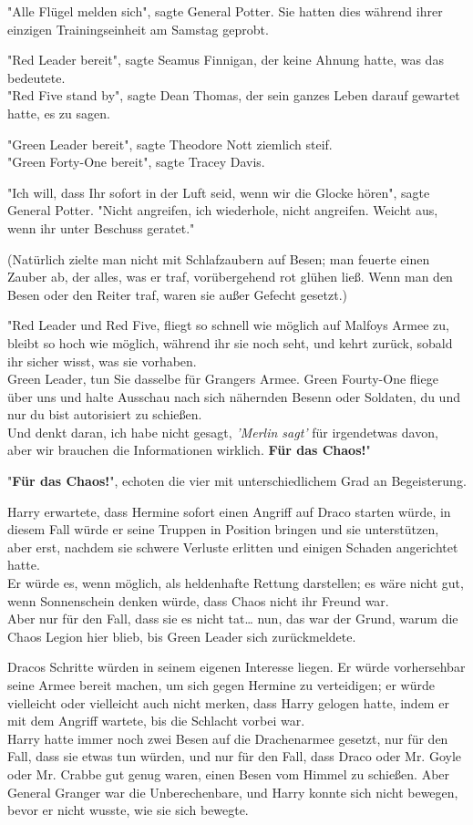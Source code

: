 {"Alle Flügel melden sich", sagte General Potter. Sie hatten dies während ihrer einzigen Trainingseinheit am Samstag geprobt.

"Red Leader bereit", sagte Seamus Finnigan, der keine Ahnung hatte, was das bedeutete.\\ "Red Five stand by", sagte Dean Thomas, der sein ganzes Leben darauf gewartet hatte, es zu sagen.

"Green Leader bereit", sagte Theodore Nott ziemlich steif.\\ "Green Forty-One bereit", sagte Tracey Davis.

"Ich will, dass Ihr sofort in der Luft seid, wenn wir die Glocke hören", sagte General Potter. "Nicht angreifen, ich wiederhole, nicht angreifen. Weicht aus, wenn ihr unter Beschuss geratet."

(Natürlich zielte man nicht mit Schlafzaubern auf Besen; man feuerte einen Zauber ab, der alles, was er traf, vorübergehend rot glühen ließ. Wenn man den Besen oder den Reiter traf, waren sie außer Gefecht gesetzt.)

"Red Leader und Red Five, fliegt so schnell wie möglich auf Malfoys Armee zu, bleibt so hoch wie möglich, während ihr sie noch seht, und kehrt zurück, sobald ihr sicher wisst, was sie vorhaben.\\ Green Leader, tun Sie dasselbe für Grangers Armee. Green Fourty-One fliege über uns und halte Ausschau nach sich nähernden Besenn oder Soldaten, du und nur du bist autorisiert zu schießen.\\ Und denkt daran, ich habe nicht gesagt, \emph{'Merlin sagt'} für irgendetwas davon, aber wir brauchen die Informationen wirklich. \textbf{Für das Chaos!}"

"\textbf{Für das Chaos!}", echoten die vier mit unterschiedlichem Grad an Begeisterung.

Harry erwartete, dass Hermine sofort einen Angriff auf Draco starten würde, in diesem Fall würde er seine Truppen in Position bringen und sie unterstützen, aber erst, nachdem sie schwere Verluste erlitten und einigen Schaden angerichtet hatte.\\ Er würde es, wenn möglich, als heldenhafte Rettung darstellen; es wäre nicht gut, wenn Sonnenschein denken würde, dass Chaos nicht ihr Freund war.\\ Aber nur für den Fall, dass sie es nicht tat… nun, das war der Grund, warum die Chaos Legion hier blieb, bis Green Leader sich zurückmeldete.

Dracos Schritte würden in seinem eigenen Interesse liegen. Er würde vorhersehbar seine Armee bereit machen, um sich gegen Hermine zu verteidigen; er würde vielleicht oder vielleicht auch nicht merken, dass Harry gelogen hatte, indem er mit dem Angriff wartete, bis die Schlacht vorbei war.\\ Harry hatte immer noch zwei Besen auf die Drachenarmee gesetzt, nur für den Fall, dass sie etwas tun würden, und nur für den Fall, dass Draco oder Mr. Goyle oder Mr. Crabbe gut genug waren, einen Besen vom Himmel zu schießen. Aber General Granger war die Unberechenbare, und Harry konnte sich nicht bewegen, bevor er nicht wusste, wie sie sich bewegte.

}
